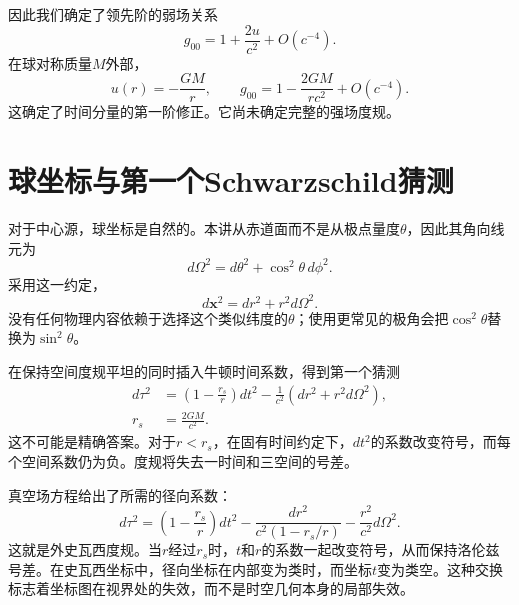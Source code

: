 因此我们确定了领先阶的弱场关系
\begin{equation}
g_{00}=1+\frac{2u}{c^2}+O(c^{-4}).
\label{eq:l5-g00-newton}
\end{equation}
在球对称质量\(M\)外部，
\begin{equation}
u(r)=-\frac{GM}{r},
\qquad
g_{00}=1-\frac{2GM}{rc^2}+O(c^{-4}).
\label{eq:l5-g00-spherical}
\end{equation}
这确定了时间分量的第一阶修正。它尚未确定完整的强场度规。

\section{球坐标与第一个Schwarzschild猜测}

对于中心源，球坐标是自然的。本讲从赤道面而不是从极点量度\(\theta\)，因此其角向线元为
\begin{equation}
d\Omega^2=d\theta^2+\cos^2\theta\,d\phi^2.
\label{eq:l5-angular-metric}
\end{equation}
采用这一约定，
\begin{equation}
d\mathbf{x}^2=dr^2+r^2d\Omega^2.
\label{eq:l5-flat-spherical}
\end{equation}
没有任何物理内容依赖于选择这个类似纬度的\(\theta\)；使用更常见的极角会把\(\cos^2\theta\)替换为\(\sin^2\theta\)。

在保持空间度规平坦的同时插入牛顿时间系数，得到第一个猜测
\begin{equation}
\begin{aligned}
d\tau^2
&=\left(1-\frac{r_s}{r}\right)dt^2
-\frac{1}{c^2}\left(dr^2+r^2d\Omega^2\right),\\
r_s&=\frac{2GM}{c^2}.
\end{aligned}
\label{eq:l5-naive-schwarzschild}
\end{equation}
这不可能是精确答案。对于\(r<r_s\)，在固有时间约定下，\(dt^2\)的系数改变符号，而每个空间系数仍为负。度规将失去一时间和三空间的号差。

真空场方程给出了所需的径向系数：
\begin{equation}
\boxed{
d\tau^2
=\left(1-\frac{r_s}{r}\right)dt^2
-\frac{dr^2}{c^2\left(1-r_s/r\right)}
-\frac{r^2}{c^2}d\Omega^2.
}
\label{eq:l5-schwarzschild}
\end{equation}
这就是外史瓦西度规。当\(r\)经过\(r_s\)时，\(t\)和\(r\)的系数一起改变符号，从而保持洛伦兹号差。在史瓦西坐标中，径向坐标在内部变为类时，而坐标\(t\)变为类空。这种交换标志着坐标图在视界处的失效，而不是时空几何本身的局部失效。

\begin{classroomqa}
\end{classroomqa}

